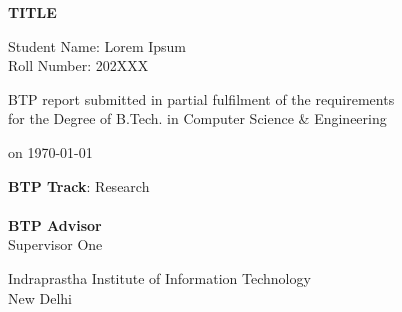 \documentclass[letterpage, 11pt]{report}
\def\title{TITLE}
\begin{document}
\def\addrone{Your address}
\def\addrtwo{Your city}

\def\degree{B.Tech. in Computer Science and Engineering}

\def\btptrack{Research}

\def\submissiondate{\today}

\def\supervisorone{Supervisor One}



\thispagestyle{empty}

\vspace{5.65in}


\begin{center}

\vspace{5.65in}

{\LARGE \bf {\title}

 }  
 \vspace{.3in}
 
 {\Large{Student Name: Lorem Ipsum}} \\  
 {\large{Roll Number: 202XXX}} \\  
 \vspace{.1in} 

  
    \vspace{.65in}



\vspace{.65in}


 {BTP report submitted in partial fulfilment of the requirements 
\\for the Degree of B.Tech. in Computer Science \& Engineering}


on \submissiondate \\

\vspace{.65in}

\textbf{BTP Track}: \btptrack\\
\quad\\

  {\textbf{BTP Advisor} \\ 
\supervisorone              \\ }
\vspace{3.0in}


{Indraprastha Institute of Information Technology\\
New Delhi}



\end{center}
\end{document}
